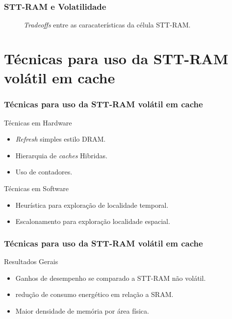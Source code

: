 \documentclass[10pt, pdf,xcolor=pdftex,dvipsnames,table]{beamer}
\begin{document}
\frame
{
\frametitle{STT-RAM e Volatilidade}
	\begin{figure}[!h]
	 \centering
	 	\caption{\textit{Tradeoffs} entre as caracaterísticas da célula STT-RAM.}
	 	\label{fig:we}
	 \end{figure}	
}

\section{Técnicas para uso da STT-RAM volátil em cache}

\frame
{
\frametitle{Técnicas para uso da STT-RAM volátil em cache}
		\begin{block}{Técnicas em Hardware}
			\begin{itemize}
				\item \textit{Refresh} simples estilo DRAM.
				\item Hierarquia de \textit{caches} Hibridas.
				\item Uso de contadores.
			\end{itemize}	 
		\end{block}
		\begin{block}{Técnicas em Software}
			\begin{itemize}
				\item Heurística para exploração de localidade temporal.
				\item Escalonamento para exploração localidade espacial.
			\end{itemize}
		\end{block}
}

\frame
{
\frametitle{Técnicas para uso da STT-RAM volátil em cache}
		\begin{block}{Resultados Gerais}
			\begin{itemize}
				\item Ganhos de desempenho se comparado a STT-RAM não volátil.
				\item redução de consumo energético em relação a SRAM.
				\item Maior densidade de memória por área física.
			\end{itemize}	 
		\end{block}
}
\end{document}
